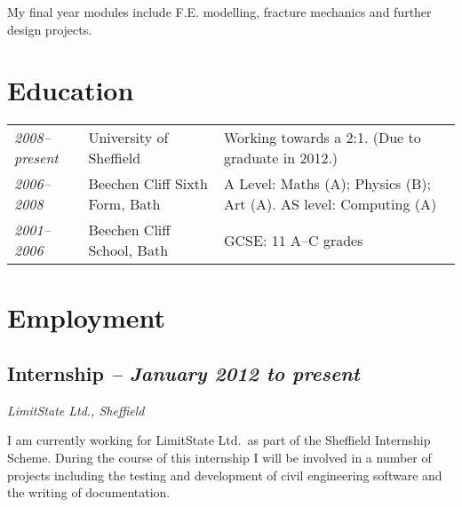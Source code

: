 \documentclass[oneside,a4paper]{article}
\begin{document}
My final year modules include F.E. modelling, fracture mechanics and further design projects.

\section*{Education}

\hspace{-6pt}\begin{tabular}{>{\it}lll}
2008--present & University of Sheffield & Working towards a 2:1. (Due to graduate in 2012.) \\
2006--2008 & Beechen Cliff Sixth Form, Bath & A Level: Maths (A); Physics (B); Art (A). AS level: Computing (A) \\
2001--2006 & Beechen Cliff School, Bath & GCSE: 11 A--C grades
\end{tabular}

\section*{Employment}

\subsection*{Internship {\it -- January 2012 to present}}
{\it LimitState Ltd., Sheffield}

I am currently working for LimitState Ltd.\ as part of the Sheffield Internship Scheme. During the course of this internship I will be involved in a number of projects including the testing and development of civil engineering software and the writing of documentation.
\end{document}
